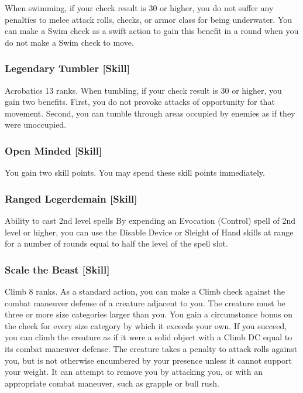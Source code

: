 When swimming, if your check result is 30 or higher, you do not suffer any penalties to melee attack rolls, checks, or armor class for being underwater. You can make a Swim check as a swift action to gain this benefit in a round when you do not make a Swim check to move.

\subsubsection{Legendary Tumbler [Skill]}
\featpre Acrobatics 13 ranks.
\featben When tumbling, if your check result is 30 or higher, you gain two benefits. First, you do not provoke attacks of opportunity for that movement. Second, you can tumble through areas occupied by enemies as if they were unoccupied.

\subsubsection{Open Minded [Skill]}
 You gain two skill points. You may spend these skill points immediately.

\subsubsection{Ranged Legerdemain [Skill]}
 Ability to cast 2nd level spells
 By expending an Evocation (Control) spell of 2nd level or higher, you can use the Disable Device or Sleight of Hand skills at \rngclose range for a number of rounds equal to half the level of the spell slot.

\subsubsection{Scale the Beast [Skill]}
\featpre Climb 8 ranks. 
\featben As a standard action, you can make a Climb check against the combat maneuver defense of a creature adjacent to you. The creature must be three or more size categories larger than you. You gain a  circumstance bonus on the check for every size category by which it exceeds your own. If you succeed, you can climb the creature as if it were a solid object with a Climb DC equal to its combat maneuver defense. The creature takes a  penalty to attack rolls against you, but is not otherwise encumbered by your presence unless it cannot support your weight. It can attempt to remove you by attacking you, or with an appropriate combat maneuver, such as grapple or bull rush.

